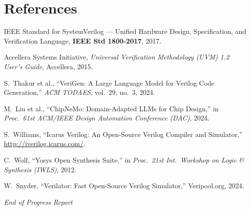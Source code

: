 \documentclass[11pt,a4paper]{article}
\begin{document}
\section*{References}
\begin{enumerate}[label={[\arabic*]},leftmargin=2.2em,itemsep=0pt,parsep=0pt]
\item IEEE Standard for SystemVerilog --- Unified Hardware Design, Specification,
and Verification Language, \textbf{IEEE Std 1800-2017}, 2017.
\item Accellera Systems Initiative, \textit{Universal Verification Methodology
(UVM) 1.2 User's Guide}, Accellera, 2015.
\item S.~Thakur et al., ``VeriGen: A Large Language Model for Verilog Code
Generation,'' \textit{ACM TODAES}, vol.~29, no.~3, 2024.
\item M.~Liu et al., ``ChipNeMo: Domain-Adapted LLMs for Chip Design,'' in
\textit{Proc.~61st ACM/IEEE Design Automation Conference (DAC)}, 2024.
\item S.~Williams, ``Icarus Verilog: An Open-Source Verilog Compiler and
Simulator,'' \url{http://iverilog.icarus.com/}.
\item C.~Wolf, ``Yosys Open Synthesis Suite,'' in \textit{Proc.~21st Int.\ Workshop
on Logic \& Synthesis (IWLS)}, 2012.
\item W.~Snyder, ``Verilator: Fast Open-Source Verilog Simulator,''
Veripool.org, 2024.
\end{enumerate}

\vspace{4pt}
\noindent{\color{ink}\rule{\textwidth}{0.8pt}}
\begin{center}
\small\itshape End of Progress Report
\end{center}
\noindent{\color{ink}\rule{\textwidth}{0.8pt}}
\end{document}
